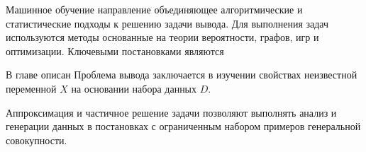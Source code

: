 Машинное обучение направление объединяющее алгоритмические и статистические подходы к решению задачи вывода.
Для выполнения задач используются методы основанные на теории вероятности, графов, игр и оптимизации. Ключевыми 
постановками являются

В главе описан 
Проблема вывода заключается в изучении свойствах неизвестной переменной $X$
на основании набора данных $D$.



Аппроксимация и частичное решение задачи позволяют выполнять анализ и генерации данных 
в постановках с ограниченным набором примеров генеральной совокупности.



